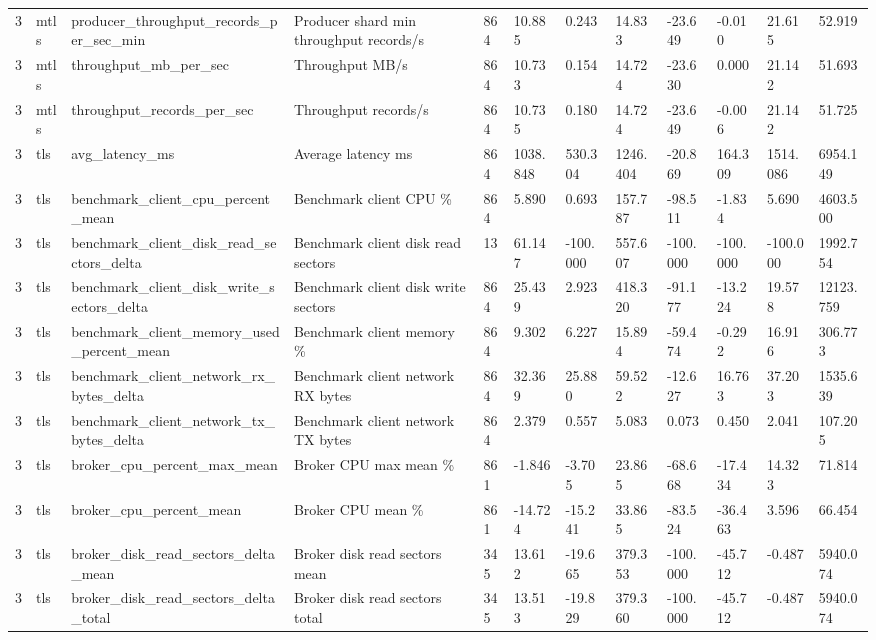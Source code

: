 \begin{longtable}{llllllllllll}
3 & mtls & producer\_throughput\_records\_per\_sec\_min & Producer shard min throughput records/s & 864 & 10.885 & 0.243 & 14.833 & -23.649 & -0.010 & 21.615 & 52.919 \\
3 & mtls & throughput\_mb\_per\_sec & Throughput MB/s & 864 & 10.733 & 0.154 & 14.724 & -23.630 & 0.000 & 21.142 & 51.693 \\
3 & mtls & throughput\_records\_per\_sec & Throughput records/s & 864 & 10.735 & 0.180 & 14.724 & -23.649 & -0.006 & 21.142 & 51.725 \\
3 & tls & avg\_latency\_ms & Average latency ms & 864 & 1038.848 & 530.304 & 1246.404 & -20.869 & 164.309 & 1514.086 & 6954.149 \\
3 & tls & benchmark\_client\_cpu\_percent\_mean & Benchmark client CPU \% & 864 & 5.890 & 0.693 & 157.787 & -98.511 & -1.834 & 5.690 & 4603.500 \\
3 & tls & benchmark\_client\_disk\_read\_sectors\_delta & Benchmark client disk read sectors & 13 & 61.147 & -100.000 & 557.607 & -100.000 & -100.000 & -100.000 & 1992.754 \\
3 & tls & benchmark\_client\_disk\_write\_sectors\_delta & Benchmark client disk write sectors & 864 & 25.439 & 2.923 & 418.320 & -91.177 & -13.224 & 19.578 & 12123.759 \\
3 & tls & benchmark\_client\_memory\_used\_percent\_mean & Benchmark client memory \% & 864 & 9.302 & 6.227 & 15.894 & -59.474 & -0.292 & 16.916 & 306.773 \\
3 & tls & benchmark\_client\_network\_rx\_bytes\_delta & Benchmark client network RX bytes & 864 & 32.369 & 25.880 & 59.522 & -12.627 & 16.763 & 37.203 & 1535.639 \\
3 & tls & benchmark\_client\_network\_tx\_bytes\_delta & Benchmark client network TX bytes & 864 & 2.379 & 0.557 & 5.083 & 0.073 & 0.450 & 2.041 & 107.205 \\
3 & tls & broker\_cpu\_percent\_max\_mean & Broker CPU max mean \% & 861 & -1.846 & -3.705 & 23.865 & -68.668 & -17.434 & 14.323 & 71.814 \\
3 & tls & broker\_cpu\_percent\_mean & Broker CPU mean \% & 861 & -14.724 & -15.241 & 33.865 & -83.524 & -36.463 & 3.596 & 66.454 \\
3 & tls & broker\_disk\_read\_sectors\_delta\_mean & Broker disk read sectors mean & 345 & 13.612 & -19.665 & 379.353 & -100.000 & -45.712 & -0.487 & 5940.074 \\
3 & tls & broker\_disk\_read\_sectors\_delta\_total & Broker disk read sectors total & 345 & 13.513 & -19.829 & 379.360 & -100.000 & -45.712 & -0.487 & 5940.074 \\

\end{longtable}
